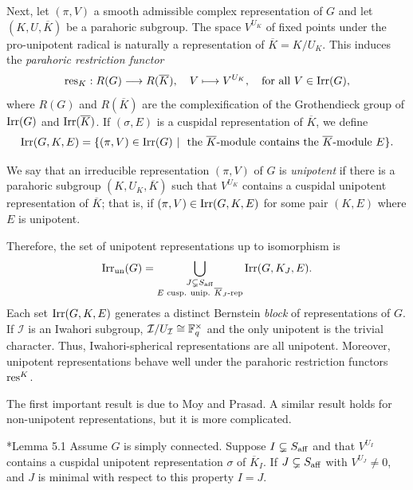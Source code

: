 Next, let $(\pi,V)$ a smooth admissible complex representation of $G$ and let $(K,U,\overline{K})$ be a parahoric subgroup. The space $V^{U_K}$ of fixed points under the pro-unipotent radical is naturally a representation of $\overline{K}=K/U_K$. This induces the \textit{parahoric restriction functor}
\begin{equation}\label{eqn:par_restriction}
    \mathrm{res}_K:R(G)\longrightarrow R(\overline{K}),\quad V\longmapsto V^{U_K},\quad\text{for all }V\in\mathrm{Irr}(G),
\end{equation}
where $R(G)$ and $R(\overline{K})$ are the complexification of the Grothendieck group of $\mathrm{Irr}(G)$ and $\mathrm{Irr}(\overline{K})$. If $(\sigma,E)$ is a cuspidal representation of $\overline{K}$, we define
$$\Irr(G,K,E)=\{(\pi,V)\in\Irr(G)\ |\ \text{ the }\overline{K}\text{-module contains the }\overline{K}\text{-module }E\}.$$
\begin{definition}
    We say that an irreducible representation $(\pi,V)$ of $G$ is \textit{unipotent} if there is a parahoric subgroup $(K,U_K,\overline{K})$ such that $V^{U_K}$ contains a cuspidal unipotent representation of $\overline{K}$; that is, if $(\pi,V)\in\mathrm{Irr}(G,K,E)$ for some pair $(K,E)$ where $E$ is unipotent.
\end{definition}
Therefore, the set of unipotent representations up to isomorphism is
$$\mathrm{Irr}_{\mathrm{un}}(G)=\bigcup_{\substack{J\subsetneq S_{\mathrm{aff}}\\ E \text{ cusp. unip. $\overline{K}_J$-rep}}}\mathrm{Irr}(G,K_J,E).$$
Each set $\mathrm{Irr}(G,K,E)$ generates a distinct Bernstein \textit{block} of representations of $G$. If $\mathcal{I}$ is an Iwahori subgroup, $\mathcal{I}/U_\mathcal{I}\cong\mathbb{F}_q^\times$ and the only unipotent is the trivial character. Thus, Iwahori-spherical representations are all unipotent. Moreover, unipotent representations behave well under the parahoric restriction functors $\mathrm{res}^K$. 

The first important result is due to Moy and Prasad. A similar result holds for non-unipotent representations, but it is more complicated. 
\begin{proposition}\label{thm:unip_restriction}\cite{Reeder2000}*{Lemma 5.1}
    Assume $G$ is simply connected. Suppose $I\subsetneq S_{\mathrm{aff}}$ and that $V^{U_I}$ contains a cuspidal unipotent representation $\sigma$ of $\overline{K}_I$. If $J\subsetneq S_{\mathrm{aff}}$ with $V^{U_J}\neq 0$, and $J$ is minimal with respect to this property $I=J$.
\end{proposition}
